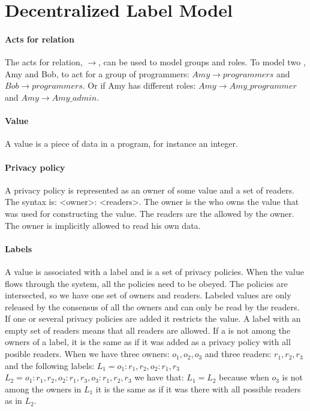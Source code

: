 \section{Decentralized Label Model}
\newcommand{\xvalue}{value}
\newcommand{\xvalues}{values}

\paragraph{Acts for relation}
The acts for relation, $\rightarrow$, can be used to model groups and roles.
To model two \principals{}, Amy and Bob, to act for a group of programmers: $Amy \rightarrow programmers$ and $Bob \rightarrow programmers$.
Or if Amy has different roles: $Amy \rightarrow Amy\_programmer$ and $Amy \rightarrow Amy\_admin$.

\paragraph{Value}
A \xvalue{} is a piece of data in a program, for instance an integer.

\paragraph{Privacy policy}
A privacy policy is represented as an owner of some \xvalue{} and a set of readers.
The syntax is: <owner>: <readers>.
The owner is the \principal{} who owns the \xvalue{} that was used for constructing the \xvalue{}.
The readers are the \principals{} allowed by the owner.
The owner is implicitly allowed to read his own data.

\paragraph{Labels}
A \xvalue{} is associated with a label and is a set of privacy policies.
When the \xvalue{} flows through the system, all the policies need to be obeyed.
The policies are intersected, so we have one set of owners and readers.
Labeled \xvalues{} are only released by the consensus of all the owners and can only be read by the readers.
If one or several privacy policies are added it restricts the \xvalue{}.
A label with an empty set of readers means that all readers are allowed.
If a \principal is not among the owners of a label, it is the same as if it was added as a privacy policy with all posible readers.
When we have three owners: $o_1, o_2, o_3$ and three readers: $r_1, r_2, r_3$ and the following labels:
$L_1 = {o_1: r_1,r_2, o_2: r_1, r_3}$ $L_2 = {o_1: r_1,r_2, o_2: r_1, r_3, o_3: r_1, r_2, r_3}$ we have that: $L_1 = L_2$ because when $o_3$ is not among the owners in $L_1$ it is the same as if it was there with all possible readers as in $L_2$.


